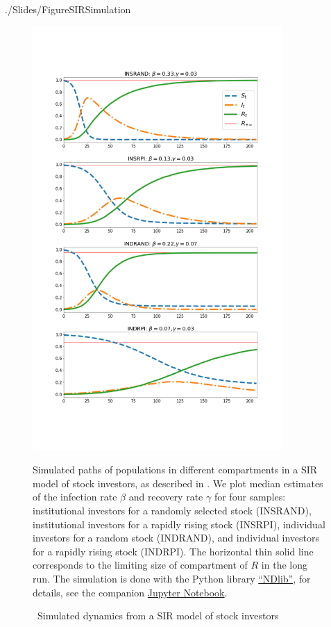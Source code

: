 \begin{verbatimwrite}{./Slides/FigureSIRSimulation}%
  \begin{figure} \centering  %
    \caption{ ~Simulated dynamics from a SIR model of stock investors}
    \label{fig:sir_simulate}
    \centerline{\includegraphics[width=0.85\textwidth,height=0.85\textheight]{./figures/sir_simulate}}
    \begin{flushleft}
      {\footnotesize Simulated paths of populations in different compartments in a SIR model of stock investors, as described in \cite{shiller1989survey}. We plot median estimates of the infection rate $\beta$ and recovery rate $\gamma$ for four samples: institutional investors for a randomly selected stock (INSRAND), institutional investors for a rapidly rising stock (INSRPI), individual investors for a random stock (INDRAND), and individual investors for a rapidly rising stock (INDRPI). The horizontal thin solid line corresponds to the limiting size of compartment of $R$ in the long run. The simulation is done with the Python library \href{https://ndlib.readthedocs.io/en/latest/}{``NDlib''}, for details, see the companion \href{https://github.com/llorracc/EpiExp/blob/master/SIR_Ndlib.ipynb}{Jupyter Notebook}. }
    \end{flushleft}
  \end{figure}
\end{verbatimwrite}%


